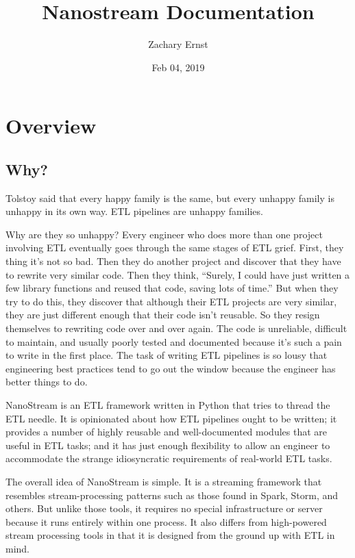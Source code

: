 \documentclass[letterpaper,10pt,english]{sphinxmanual}
\title{Nanostream Documentation}
\date{Feb 04, 2019}
\author{Zachary Ernst}
\begin{document}
\pagestyle{empty}
\maketitle
\pagestyle{plain}
\sphinxtableofcontents
\pagestyle{normal}
\label{\detokenize{index::doc}}



\chapter{Overview}
\label{\detokenize{overview:overview}}\label{\detokenize{overview::doc}}

\section{Why?}
\label{\detokenize{overview:why}}
Tolstoy said that every happy family is the same, but every unhappy family is
unhappy in its own way. ETL pipelines are unhappy families.

Why are they so unhappy? Every engineer who does more than one project involving
ETL eventually goes through the same stages of ETL grief. First, they thing it’s
not so bad. Then they do another project and discover that they have to rewrite
very similar code. Then they think, “Surely, I could have just written a few
library functions and reused that code, saving lots of time.” But when they try
to do this, they discover that although their ETL projects are very similar,
they are just different enough that their code isn’t reusable. So they resign
themselves to rewriting code over and over again. The code is unreliable,
difficult to maintain, and usually poorly tested and documented because it’s
such a pain to write in the first place. The task of writing ETL pipelines is
so lousy that engineering best practices tend to go out the window because
the engineer has better things to do.

NanoStream is an ETL framework written in Python that tries to thread the ETL
needle. It is opinionated about how ETL pipelines ought to be written; it
provides a number of highly reusable and well-documented modules that are
useful in ETL tasks; and it has just enough flexibility to allow an engineer
to accommodate the strange idiosyncratic requirements of real-world ETL tasks.

The overall idea of NanoStream is simple. It is a streaming framework that
resembles stream-processing patterns such as those found in Spark, Storm, and
others. But unlike those tools, it requires no special infrastructure or
server because it runs entirely within one process. It also differs from
high-powered stream processing tools in that it is designed from the ground
up with ETL in mind.
\end{document}
